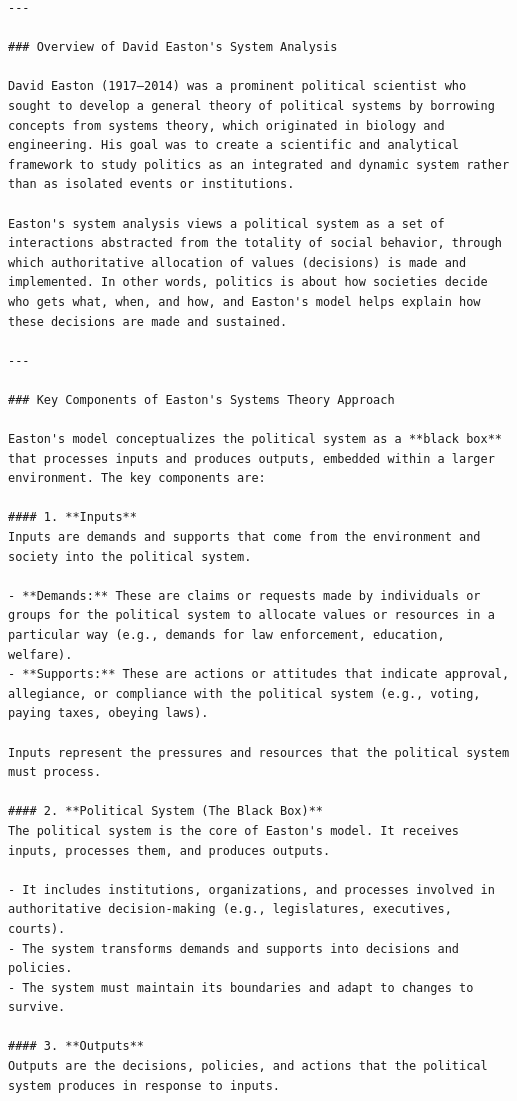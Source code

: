 \begin{instructbox}
\begin{lstlisting}[breakindent=0pt, breaklines=true, breakatwhitespace=true, frame=single, backgroundcolor=\color{green!10}]
---

### Overview of David Easton's System Analysis

David Easton (1917–2014) was a prominent political scientist who sought to develop a general theory of political systems by borrowing concepts from systems theory, which originated in biology and engineering. His goal was to create a scientific and analytical framework to study politics as an integrated and dynamic system rather than as isolated events or institutions.

Easton's system analysis views a political system as a set of interactions abstracted from the totality of social behavior, through which authoritative allocation of values (decisions) is made and implemented. In other words, politics is about how societies decide who gets what, when, and how, and Easton's model helps explain how these decisions are made and sustained.

---

### Key Components of Easton's Systems Theory Approach

Easton's model conceptualizes the political system as a **black box** that processes inputs and produces outputs, embedded within a larger environment. The key components are:

#### 1. **Inputs**
Inputs are demands and supports that come from the environment and society into the political system.

- **Demands:** These are claims or requests made by individuals or groups for the political system to allocate values or resources in a particular way (e.g., demands for law enforcement, education, welfare).
- **Supports:** These are actions or attitudes that indicate approval, allegiance, or compliance with the political system (e.g., voting, paying taxes, obeying laws).

Inputs represent the pressures and resources that the political system must process.

#### 2. **Political System (The Black Box)**
The political system is the core of Easton's model. It receives inputs, processes them, and produces outputs.

- It includes institutions, organizations, and processes involved in authoritative decision-making (e.g., legislatures, executives, courts).
- The system transforms demands and supports into decisions and policies.
- The system must maintain its boundaries and adapt to changes to survive.

#### 3. **Outputs**
Outputs are the decisions, policies, and actions that the political system produces in response to inputs.


\end{lstlisting}
\end{instructbox}
